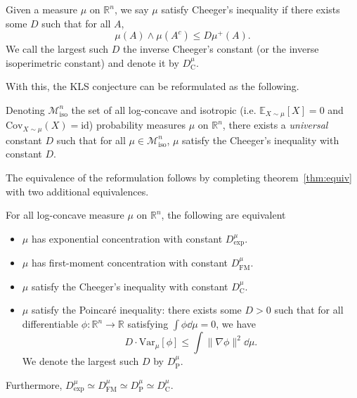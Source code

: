 \begin{definition}
  Given a measure \(\mu\) on \(\mathbb{R}^n\), we say \(\mu\) satisfy Cheeger's inequality 
  if there exists some \(D\) such that for all \(A\),
  \[\mu(A) \wedge \mu(A^c) \le D\mu^+(A).\]
  We call the largest such \(D\) the inverse Cheeger's constant (or the inverse isoperimetric constant) and 
  denote it by \(D^\mu_{\text{C}}\).
\end{definition}

With this, the KLS conjecture can be reformulated as the following.

\begin{conjecture}
  Denoting \(\mathscr{M}^n_{\text{iso}}\) the set of all log-concave and isotropic 
  (i.e. \(\mathbb{E}_{X \sim \mu}[X] = 0\) and \(\text{Cov}_{X \sim \mu}(X) = \text{id}\)) probability measures \(\mu\) on 
  \(\mathbb{R}^n\), there exists a \textit{universal} constant \(D\) such that for all 
  \(\mu \in \mathscr{M}^n_{\text{iso}}\), \(\mu\) satisfy the Cheeger's inequality with constant \(D\).
\end{conjecture}

The equivalence of the reformulation follows by completing theorem~\ref{thm:equiv} with two additional 
equivalences.

\begin{theorem}\label{thm:milman2}
  For all log-concave measure \(\mu\) on \(\mathbb{R}^n\), the following are equivalent
  \begin{itemize}
    \item \(\mu\) has exponential concentration with constant \(D^\mu_\text{exp}\).
    \item \(\mu\) has first-moment concentration with constant \(D^\mu_\text{FM}\).
    \item \(\mu\) satisfy the Cheeger's inequality with constant \(D^\mu_\text{C}\).
    \item \(\mu\) satisfy the Poincaré inequality: there exists some \(D > 0\) such that for all 
      differentiable \(\phi : \mathbb{R}^n \to \mathbb{R}\) satisfying \(\int \phi \dd\mu = 0\), we have
      \[D \cdot \text{Var}_\mu[\phi] \le \int \|\nabla \phi\|^2 \dd\mu.\]
      We denote the largest such \(D\) by \(D^\mu_{\text{P}}\).
  \end{itemize}
  Furthermore, \(D^\mu_{\text{exp}} \simeq D^\mu_{\text{FM}} \simeq D^\mu_{\text{P}} \simeq D^\mu_{\text{C}}\).
\end{theorem}

